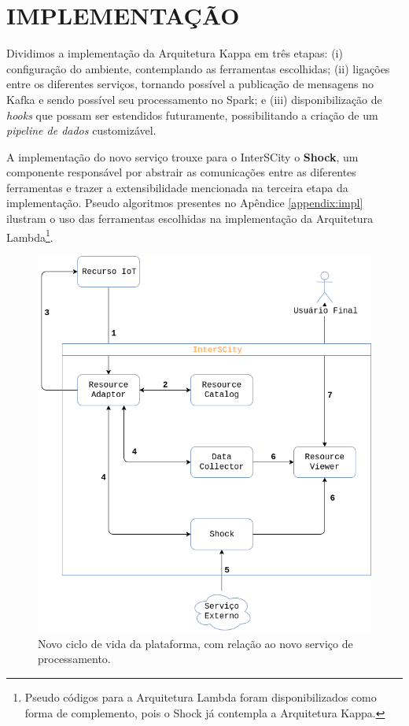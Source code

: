 \section{IMPLEMENTAÇÃO}

Dividimos a implementação da Arquitetura Kappa em três etapas:
(i) configuração do ambiente, contemplando as ferramentas escolhidas;
(ii) ligações entre os diferentes serviços, tornando possível a publicação de
    mensagens no Kafka e sendo possível seu processamento no Spark; e
(iii) disponibilização de \textit{hooks} que possam ser estendidos futuramente,
    possibilitando a criação de um \textit{pipeline de dados} customizável.

A implementação do novo serviço trouxe para o InterSCity o \textbf{Shock},
um componente responsável por abstrair as comunicações entre as diferentes
ferramentas e trazer a extensibilidade mencionada na terceira etapa da
implementação. Pseudo algoritmos presentes no Apêndice \ref{appendix:impl}
ilustram o uso das ferramentas escolhidas na implementação da Arquitetura
Lambda\footnote{
Pseudo códigos para a Arquitetura Lambda foram disponibilizados como forma
de complemento, pois o Shock já contempla a Arquitetura Kappa.
}.

\begin{figure}
  \centering
    \includegraphics[scale=0.45]{figuras/shock_usage.png}
    \caption{Novo ciclo de vida da plataforma, com relação ao novo serviço de processamento.}
  \label{fig:shock_usage}
\end{figure}

